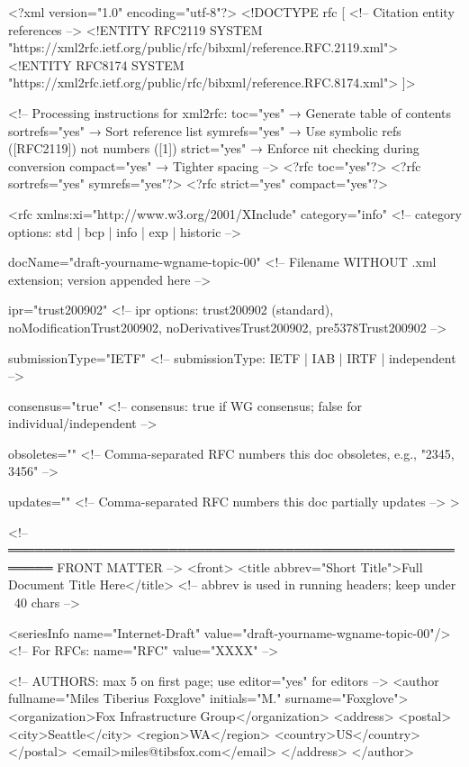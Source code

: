 \documentclass[11pt,letterpaper]{article}
\begin{document}
\begin{codebox}
<?xml version="1.0" encoding="utf-8"?>
<!DOCTYPE rfc [
  <!-- Citation entity references -->
  <!ENTITY RFC2119 SYSTEM
    "https://xml2rfc.ietf.org/public/rfc/bibxml/reference.RFC.2119.xml">
  <!ENTITY RFC8174 SYSTEM
    "https://xml2rfc.ietf.org/public/rfc/bibxml/reference.RFC.8174.xml">
]>

<!--
  Processing instructions for xml2rfc:
  toc="yes"       → Generate table of contents
  sortrefs="yes"  → Sort reference list
  symrefs="yes"   → Use symbolic refs ([RFC2119]) not numbers ([1])
  strict="yes"    → Enforce nit checking during conversion
  compact="yes"   → Tighter spacing
-->
<?rfc toc="yes"?>
<?rfc sortrefs="yes" symrefs="yes"?>
<?rfc strict="yes" compact="yes"?>

<rfc
  xmlns:xi="http://www.w3.org/2001/XInclude"
  category="info"
  <!-- category options: std | bcp | info | exp | historic -->

  docName="draft-yourname-wgname-topic-00"
  <!-- Filename WITHOUT .xml extension; version appended here -->

  ipr="trust200902"
  <!-- ipr options: trust200902 (standard), noModificationTrust200902,
       noDerivativesTrust200902, pre5378Trust200902 -->

  submissionType="IETF"
  <!-- submissionType: IETF | IAB | IRTF | independent -->

  consensus="true"
  <!-- consensus: true if WG consensus; false for individual/independent -->

  obsoletes=""
  <!-- Comma-separated RFC numbers this doc obsoletes, e.g., "2345, 3456" -->

  updates=""
  <!-- Comma-separated RFC numbers this doc partially updates -->
>

<!-- ═══════════════════════════════════════════════════════ FRONT MATTER -->
<front>
  <title abbrev="Short Title">Full Document Title Here</title>
  <!-- abbrev is used in running headers; keep under ~40 chars -->

  <seriesInfo name="Internet-Draft"
              value="draft-yourname-wgname-topic-00"/>
  <!-- For RFCs: name="RFC" value="XXXX" -->

  <!-- AUTHORS: max 5 on first page; use editor="yes" for editors -->
  <author fullname="Miles Tiberius Foxglove" initials="M." surname="Foxglove">
    <organization>Fox Infrastructure Group</organization>
    <address>
      <postal>
        <city>Seattle</city>
        <region>WA</region>
        <country>US</country>
      </postal>
      <email>miles@tibsfox.com</email>
    </address>
  </author>


\end{codebox}
\end{document}
